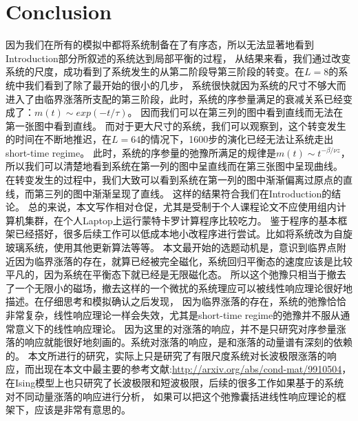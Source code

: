 \documentclass[a4paper]{article}
\begin{document}
\section{Conclusion}
因为我们在所有的模拟中都将系统制备在了有序态，所以无法显著地看到Introduction部分所叙述的系统达到局部平衡的过程，
从结果来看，我们通过改变系统的尺度，成功看到了系统发生的从第二阶段导第三阶段的转变。在$L=8$的系统中我们看到了除了最开始的很小的几步，
系统很快就因为系统的尺寸不够大而进入了由临界涨落所支配的第三阶段，此时，系统的序参量满足的衰减关系已经变成了：$m(t)\sim exp(-t/\tau)$。
因而我们可以在第三列的图中看到直线而无法在第一张图中看到直线。
而对于更大尺寸的系统，我们可以观察到，这个转变发生的时间在不断地推迟，在$L=64$的情况下，1600步的演化已经无法让系统走出short-time regime。
此时，系统的序参量的弛豫所满足的规律是$m(t)\sim t^{-\beta/\nu z}$，所以我们可以清楚地看到系统在第一列的图中呈直线而在第三张图中呈现曲线。
在转变发生的过程中，我们大致可以看到系统在第一列的图中渐渐偏离过原点的直线，而第三列的图中渐渐呈现了直线。
这样的结果符合我们在Introduction的结论。\newline
总的来说，本文写作相对仓促，尤其是受制于个人课程论文不应使用组内计算机集群，在个人Laptop上运行蒙特卡罗计算程序比较吃力。
鉴于程序的基本框架已经搭好，很多后续工作可以低成本地小改程序进行尝试。比如将系统改为自旋玻璃系统，使用其他更新算法等等。
本文最开始的选题动机是，意识到临界点附近因为临界涨落的存在，就算已经被完全磁化，系统回归平衡态的速度应该是比较平凡的，因为系统在平衡态下就已经是无限磁化态。
所以这个弛豫只相当于撤去了一个无限小的磁场，撤去这样的一个微扰的系统理应可以被线性响应理论很好地描述。在仔细思考和模拟确认之后发现，
因为临界涨落的存在，系统的弛豫恰恰非常复杂，线性响应理论一样会失效，尤其是short-time regime的弛豫并不服从通常意义下的线性响应理论。
因为这里的对涨落的响应，并不是只研究对序参量涨落的响应就能很好地刻画的。系统对涨落的响应，是和涨落的动量谱有深刻的依赖的。
本文所进行的研究，实际上只是研究了有限尺度系统对长波极限涨落的响应，而出现在本文中最主要的参考文献:\url{http://arxiv.org/abs/cond-mat/9910504}，
在Ising模型上也只研究了长波极限和短波极限，后续的很多工作如果基于的系统对不同动量涨落的响应进行分析，
如果可以把这个弛豫囊括进线性响应理论的框架下，应该是非常有意思的。
\end{document}
